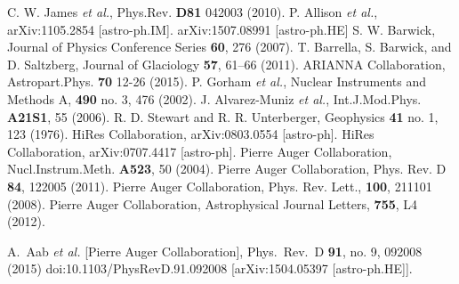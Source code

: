 \begin{thebibliography}{1}
  C. W. James {\it et al.}, Phys.Rev. \textbf{D81}  042003 (2010).
 P. Allison {\it et al.}, arXiv:1105.2854 [astro-ph.IM].
 arXiv:1507.08991 [astro-ph.HE]
 S. W. Barwick, Journal of Physics Conference Series \textbf{60}, 276 (2007).
  T. Barrella, S. Barwick, and D. Saltzberg, Journal of Glaciology \textbf{57}, 61–66 (2011).
 ARIANNA Collaboration, Astropart.Phys. \textbf{70} 12-26 (2015).
  P. Gorham {\it et al.}, Nuclear Instruments and Methods A, \textbf{490} no. 3,  476 (2002).
 J. Alvarez-Muniz {\it et al.}, Int.J.Mod.Phys. \textbf{A21S1}, 55 (2006).
 R. D. Stewart and R. R. Unterberger, Geophysics \textbf{41} no. 1, 123 (1976).
 HiRes Collaboration, arXiv:0803.0554 [astro-ph].
 HiRes Collaboration, arXiv:0707.4417 [astro-ph].
 Pierre Auger Collaboration, Nucl.Instrum.Meth. \textbf{A523},  50 (2004).
 Pierre Auger Collaboration, Phys. Rev. D \textbf{84}, 122005 (2011).
 Pierre Auger Collaboration, Phys. Rev. Lett., \textbf{100}, 211101 (2008).
 Pierre Auger Collaboration, Astrophysical Journal Letters, \textbf{755}, L4 (2012).

  A.~Aab {\it et al.} [Pierre Auger Collaboration],
  Phys.\ Rev.\ D {\bf 91}, no. 9, 092008 (2015)
  doi:10.1103/PhysRevD.91.092008
  [arXiv:1504.05397 [astro-ph.HE]].


\end{thebibliography}
